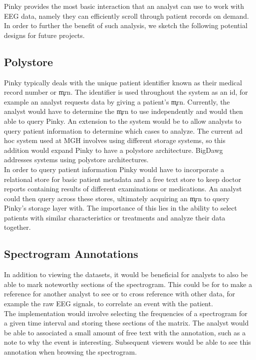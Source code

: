 Pinky provides the most basic interaction that an analyst can use to work with
EEG data, namely they can efficiently scroll through patient records on demand.
In order to further the benefit of such analysis, we sketch the following
potential designs for future projects.

\subsection{Polystore}

Pinky typically deals with the unique patient identifier known as their medical
record number or \c{mrn}. The identifier is used throughout the system as an
id, for example an analyst requests data by giving a patient's \c{mrn}.
Currently, the analyst would have to determine the \c{mrn} to use independently
and would then able to query Pinky. An extension to the system would be to
allow analysts to query patient information to determine which cases to
analyze. The current ad hoc system used at MGH involves using different storage
systems, so this addition would expand Pinky to have a polystore architecture.
BigDawg \cite{bigdawg} addresses systems using polystore architectures. \\

In order to query patient information Pinky would have to incorporate a
relational store for basic patient metadata and a free text store to keep
doctor reports containing results of different examinations or medications. An
analyst could then query across these stores, ultimately acquiring an \c{mrn}
to query Pinky's storage layer with. The importance of this lies in the ability
to select patients with similar characteristics or treatments and analyze their
data together.

\subsection{Spectrogram Annotations}\label{discuss-ch:annotations}

In addition to viewing the datasets, it would be beneficial for analysts to
also be able to mark noteworthy sections of the spectrogram. This could be for
to make a reference for another analyst to see or to cross reference with other
data, for example the raw EEG signals, to correlate an event with the patient. \\

The implementation would involve selecting the frequencies of a spectrogram for
a given time interval and storing these sections of the matrix.  The analyst
would be able to associated a small amount of free text with the annotation,
such as a note to why the event is interesting. Subsequent viewers would be
able to see this annotation when browsing the spectrogram.


